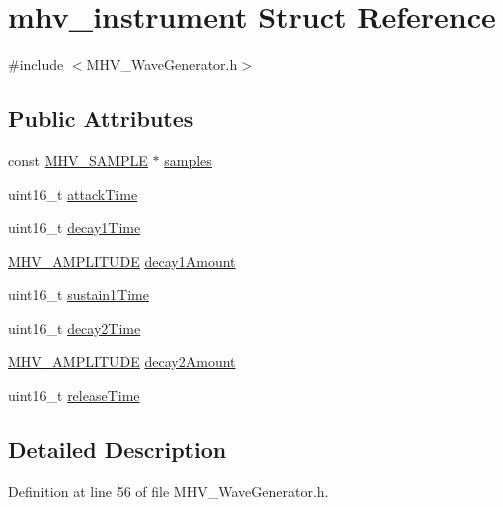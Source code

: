 \hypertarget{structmhv__instrument}{
\section{mhv\-\_\-instrument \-Struct \-Reference}
\label{structmhv__instrument}
}


{\ttfamily \#include $<$\-M\-H\-V\-\_\-\-Wave\-Generator.\-h$>$}

\subsection*{\-Public \-Attributes}
\begin{DoxyCompactItemize}
\item 
const \hyperlink{_m_h_v___d_a_c_8h_a5ed12db0bcd6a3870733daecfb30e640}{\-M\-H\-V\-\_\-\-S\-A\-M\-P\-L\-E} $\ast$ \hyperlink{structmhv__instrument_a1a3dd705816f79c9f44da16743f38516}{samples}
\item 
uint16\-\_\-t \hyperlink{structmhv__instrument_a9b85066674551959ac0ef4d57bedfcb5}{attack\-Time}
\item 
uint16\-\_\-t \hyperlink{structmhv__instrument_a8ba9f75ad91b531d497d18bad6351d9d}{decay1\-Time}
\item 
\hyperlink{_m_h_v___wave_generator_8h_ae0ff00bbcfd596fc3d6afab09bb5e11c}{\-M\-H\-V\-\_\-\-A\-M\-P\-L\-I\-T\-U\-D\-E} \hyperlink{structmhv__instrument_a922f4e32b9e9c1b7e685124845fed1ad}{decay1\-Amount}
\item 
uint16\-\_\-t \hyperlink{structmhv__instrument_aff146a5abc59a0654d31089fe23d623e}{sustain1\-Time}
\item 
uint16\-\_\-t \hyperlink{structmhv__instrument_a68888a2d53929235d2e5379d46968325}{decay2\-Time}
\item 
\hyperlink{_m_h_v___wave_generator_8h_ae0ff00bbcfd596fc3d6afab09bb5e11c}{\-M\-H\-V\-\_\-\-A\-M\-P\-L\-I\-T\-U\-D\-E} \hyperlink{structmhv__instrument_a54b5eec4d485a7c096377290a2aa5456}{decay2\-Amount}
\item 
uint16\-\_\-t \hyperlink{structmhv__instrument_a376cf3d2ec80de657a1bc947f34eab55}{release\-Time}
\end{DoxyCompactItemize}


\subsection{\-Detailed \-Description}


\-Definition at line 56 of file \-M\-H\-V\-\_\-\-Wave\-Generator.\-h.




